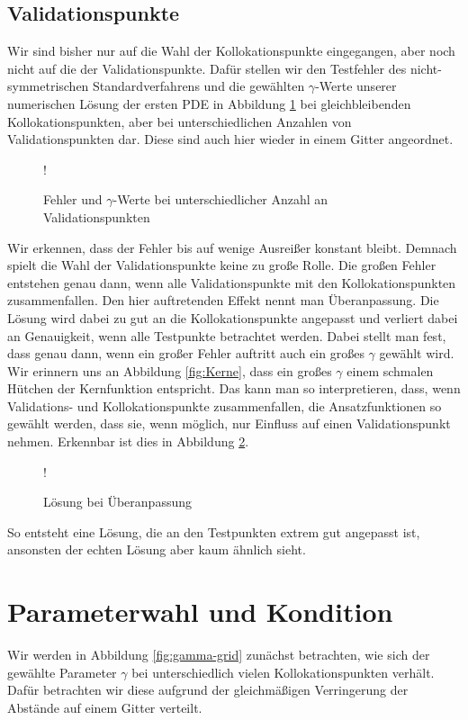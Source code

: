\subsection{Validationspunkte}
Wir sind bisher nur auf die Wahl der Kollokationspunkte eingegangen, aber noch nicht auf die der Validationspunkte. Dafür stellen wir den Testfehler des nicht-symmetrischen Standardverfahrens und die gewählten $\gamma$-Werte unserer numerischen Lösung der ersten \ac{PDE} in Abbildung \ref{fig:testpunkte} bei gleichbleibenden Kollokationspunkten, aber bei unterschiedlichen Anzahlen von Validationspunkten dar. Diese sind auch hier wieder in einem Gitter angeordnet.
\begin{figure}[ht]
\centering
\resizebox {\columnwidth} {!} {

}
\caption{Fehler und $\gamma$-Werte bei unterschiedlicher Anzahl an Validationspunkten}
\label{fig:testpunkte}
\end{figure}
Wir erkennen, dass der Fehler bis auf wenige Ausreißer konstant bleibt. Demnach spielt die Wahl der Validationspunkte keine zu große Rolle. Die großen Fehler entstehen genau dann, wenn alle Validationspunkte mit den Kollokationspunkten zusammenfallen. Den hier auftretenden Effekt nennt man Überanpassung. Die Lösung wird dabei zu gut an die Kollokationspunkte angepasst und verliert dabei an Genauigkeit, wenn alle Testpunkte betrachtet werden. Dabei stellt man fest, dass genau dann, wenn ein großer Fehler auftritt auch ein großes $\gamma$ gewählt wird. Wir erinnern uns an Abbildung \ref{fig:Kerne}, dass ein großes $\gamma$ einem schmalen \glqq Hütchen\grqq{}  der Kernfunktion entspricht. Das kann man so interpretieren, dass, wenn Validations- und Kollokationspunkte zusammenfallen, die Ansatzfunktionen so gewählt werden, dass sie, wenn möglich, nur \glqq Einfluss \grqq{} auf einen Validationspunkt nehmen. Erkennbar ist dies in Abbildung \ref{fig:overfitting}.
\begin{figure}[ht]
\centering
\resizebox {\columnwidth} {!} {

}
\caption{Lösung bei Überanpassung}
\label{fig:overfitting}
\end{figure}
So entsteht eine Lösung, die an den Testpunkten extrem gut angepasst ist, ansonsten der echten Lösung aber kaum ähnlich sieht.

\section{Parameterwahl und Kondition}
Wir werden in Abbildung \ref{fig:gamma-grid} zunächst betrachten, wie sich der gewählte Parameter $\gamma$ bei unterschiedlich vielen Kollokationspunkten verhält. Dafür betrachten wir diese aufgrund der gleichmäßigen Verringerung der Abstände auf einem Gitter verteilt. 

